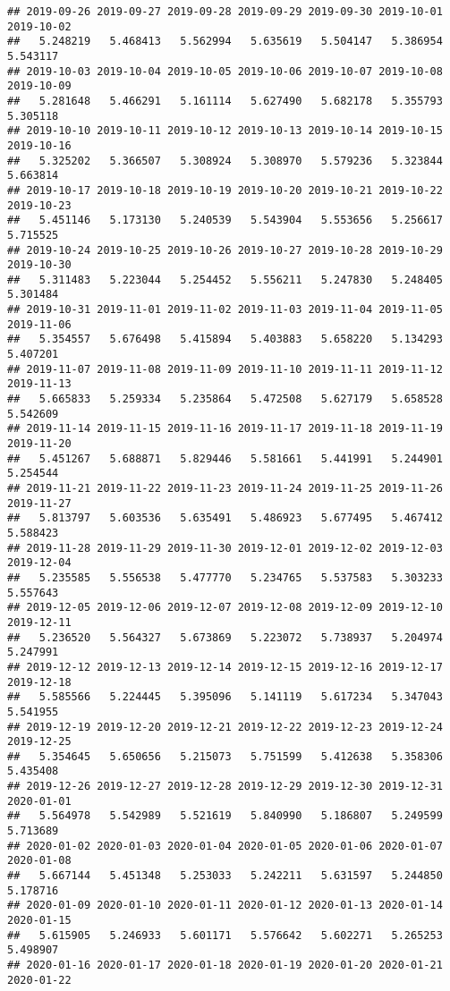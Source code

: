 \documentclass[
]{article}
\begin{document}
\begin{verbatim}
## 2019-09-26 2019-09-27 2019-09-28 2019-09-29 2019-09-30 2019-10-01 2019-10-02 
##   5.248219   5.468413   5.562994   5.635619   5.504147   5.386954   5.543117 
## 2019-10-03 2019-10-04 2019-10-05 2019-10-06 2019-10-07 2019-10-08 2019-10-09 
##   5.281648   5.466291   5.161114   5.627490   5.682178   5.355793   5.305118 
## 2019-10-10 2019-10-11 2019-10-12 2019-10-13 2019-10-14 2019-10-15 2019-10-16 
##   5.325202   5.366507   5.308924   5.308970   5.579236   5.323844   5.663814 
## 2019-10-17 2019-10-18 2019-10-19 2019-10-20 2019-10-21 2019-10-22 2019-10-23 
##   5.451146   5.173130   5.240539   5.543904   5.553656   5.256617   5.715525 
## 2019-10-24 2019-10-25 2019-10-26 2019-10-27 2019-10-28 2019-10-29 2019-10-30 
##   5.311483   5.223044   5.254452   5.556211   5.247830   5.248405   5.301484 
## 2019-10-31 2019-11-01 2019-11-02 2019-11-03 2019-11-04 2019-11-05 2019-11-06 
##   5.354557   5.676498   5.415894   5.403883   5.658220   5.134293   5.407201 
## 2019-11-07 2019-11-08 2019-11-09 2019-11-10 2019-11-11 2019-11-12 2019-11-13 
##   5.665833   5.259334   5.235864   5.472508   5.627179   5.658528   5.542609 
## 2019-11-14 2019-11-15 2019-11-16 2019-11-17 2019-11-18 2019-11-19 2019-11-20 
##   5.451267   5.688871   5.829446   5.581661   5.441991   5.244901   5.254544 
## 2019-11-21 2019-11-22 2019-11-23 2019-11-24 2019-11-25 2019-11-26 2019-11-27 
##   5.813797   5.603536   5.635491   5.486923   5.677495   5.467412   5.588423 
## 2019-11-28 2019-11-29 2019-11-30 2019-12-01 2019-12-02 2019-12-03 2019-12-04 
##   5.235585   5.556538   5.477770   5.234765   5.537583   5.303233   5.557643 
## 2019-12-05 2019-12-06 2019-12-07 2019-12-08 2019-12-09 2019-12-10 2019-12-11 
##   5.236520   5.564327   5.673869   5.223072   5.738937   5.204974   5.247991 
## 2019-12-12 2019-12-13 2019-12-14 2019-12-15 2019-12-16 2019-12-17 2019-12-18 
##   5.585566   5.224445   5.395096   5.141119   5.617234   5.347043   5.541955 
## 2019-12-19 2019-12-20 2019-12-21 2019-12-22 2019-12-23 2019-12-24 2019-12-25 
##   5.354645   5.650656   5.215073   5.751599   5.412638   5.358306   5.435408 
## 2019-12-26 2019-12-27 2019-12-28 2019-12-29 2019-12-30 2019-12-31 2020-01-01 
##   5.564978   5.542989   5.521619   5.840990   5.186807   5.249599   5.713689 
## 2020-01-02 2020-01-03 2020-01-04 2020-01-05 2020-01-06 2020-01-07 2020-01-08 
##   5.667144   5.451348   5.253033   5.242211   5.631597   5.244850   5.178716 
## 2020-01-09 2020-01-10 2020-01-11 2020-01-12 2020-01-13 2020-01-14 2020-01-15 
##   5.615905   5.246933   5.601171   5.576642   5.602271   5.265253   5.498907 
## 2020-01-16 2020-01-17 2020-01-18 2020-01-19 2020-01-20 2020-01-21 2020-01-22 

\end{verbatim}
\end{document}
